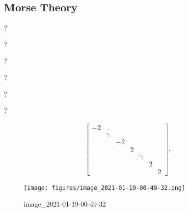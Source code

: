 \hypertarget{morse-theory}{%
\subsection{Morse Theory}\label{morse-theory}}

\begin{definition}

?

\end{definition}

\begin{definition}

?

\end{definition}

\begin{definition}

?

\end{definition}

\begin{definition}

?

\end{definition}

\begin{definition}

?

\end{definition}

\begin{theorem}

?

\end{theorem}

\begin{align*}
\begin{bmatrix}
-2&&&&&&\\
&\ddots&&&&&\\
&&-2&&&&\\
&&&2&&&\\
&&&&\ddots&&\\
&&&&&2&\\
&&&&&&2
\end{bmatrix}
.\end{align*}

\begin{example}[Sphere]

\begin{figure}
\centering
\texttt{[image: figures/image\_2021-01-19-00-49-32.png]}
\caption{image\_2021-01-19-00-49-32}
\end{figure}

\end{example}

